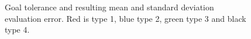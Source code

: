 \begin{figure}
    \caption{Goal tolerance and resulting mean and standard deviation evaluation error. Red is type 1, blue type 2, green type 3 and black type 4.}
    \label{fig:learning-eval}
\end{figure}


